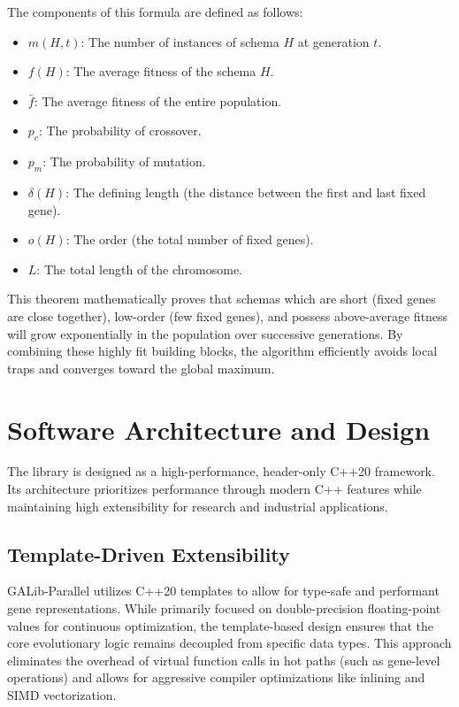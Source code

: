\documentclass[conference]{IEEEtran}
\begin{document}
        The components of this formula are defined as follows:
        \begin{itemize}
            \item $m(H, t)$: The number of instances of schema $H$ at generation $t$.
            \item $f(H)$: The average fitness of the schema $H$.
            \item $\bar{f}$: The average fitness of the entire population.
            \item $p_c$: The probability of crossover.
            \item $p_m$: The probability of mutation.
            \item $\delta(H)$: The defining length (the distance between the first and last fixed gene).
            \item $o(H)$: The order (the total number of fixed genes).
            \item $L$: The total length of the chromosome.
        \end{itemize}

    This theorem mathematically proves that schemas which are short (fixed genes are close together), low-order (few fixed genes), and possess above-average fitness will grow exponentially in the population over successive generations. By combining these highly fit building blocks, the algorithm efficiently avoids local traps and converges toward the global maximum.

    \section{Software Architecture and Design}
    The library is designed as a high-performance, header-only C++20 framework. Its architecture prioritizes performance through modern C++ features while maintaining high extensibility for research and industrial applications.

    \subsection{Template-Driven Extensibility}
    GALib-Parallel utilizes C++20 templates to allow for type-safe and performant gene representations. While primarily focused on double-precision floating-point values for continuous optimization, the template-based design ensures that the core evolutionary logic remains decoupled from specific data types. This approach eliminates the overhead of virtual function calls in hot paths (such as gene-level operations) and allows for aggressive compiler optimizations like inlining and SIMD vectorization.
\end{document}
